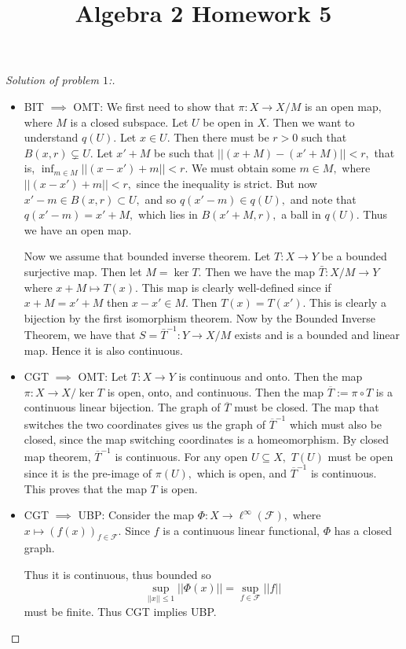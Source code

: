 \documentclass[letterpaper,11pt,twoside]{article}
\title{Algebra 2 Homework 5}
\theoremstyle{proposition}
\theoremstyle{definition}
\theoremstyle{theorem}
\theoremstyle{definition}
\theoremstyle{definition}
\theoremstyle{definition}
\theoremstyle{lemma}
\theoremstyle{definition}
\theoremstyle{definition}
\theoremstyle{corollary}
\theoremstyle{definition}
\theoremstyle{definition}
\theoremstyle{definition}
\newcommand{\norm}[1]{\left \vert \left \vert #1 \right \vert \right \vert}
\begin{document}
	\maketitle
	\begin{proof}[Solution of problem $1$:]
		\begin{itemize}
			\item BIT $\implies$ OMT: We first need to show that $\pi: X \to X/M$ is an open map, where $M$ is a closed subspace. Let $U$ be open in $X.$ 
			Then we want to understand $q(U).$ Let $x \in U.$ Then there must be $r >0$ such that $B(x,r) \subsetneq U.$ Let $x'+M$ be such that 
			$\norm{(x+M)-(x'+M)} <r,$ that is, $\inf_{m \in M} \norm{(x-x')+m} <r.$ We must obtain some $m \in M,$ where $ \norm{(x-x')+m} <r,$ since the 
			inequality is strict. But now $x'-m \in B(x,r) \subset U,$ and so $q(x'-m) \in q(U),$ and note that $q(x'-m)=x'+M,$ which lies in $B(x'+M,r),$ a 
			ball in $q(U).$ Thus we have an open map.
			
			Now we assume that bounded inverse theorem. Let $T:X \to Y$ be a bounded surjective map. Then let $M=\ker T.$ Then we have the map $\bar{T}: X/M 
			\to Y$ where $x+M \mapsto T(x).$  This map is clearly well-defined since if $x+M=x'+M$ then $x-x' \in M.$ Then $T(x)=T(x').$ This is clearly a 
			bijection by the first isomorphism theorem.  Now by the Bounded Inverse Theorem, we have that $S= \bar{T}^{-1}: Y \to X/M$ exists and is a 
			bounded and linear map. Hence it is also continuous. 
			\item CGT $\implies$ OMT: Let $T:X \to Y$ is continuous and onto. Then the map $\pi: X \to X/\ker T$ is open, onto, and continuous. Then the map 
			$\overline{T} := \pi \circ T$ is a continuous linear bijection. The graph of $\overline{T}$ must be closed. The map that switches the two 
			coordinates gives us the graph of $\overline{T}^{-1}$ which must also be closed, since the map switching coordinates is a homeomorphism. By 
			closed map theorem, $\overline{T}^{-1}$ is continuous. For any open $U \subseteq X,$ $T(U)$ must be open since it is the pre-image of $\pi(U),$ 
			which is open, and $\overline{T}^{-1}$ is continuous. This proves that the map $T$ is open. 
			
			\item CGT $\implies$ UBP: Consider the map $\Phi: X \to \ell^{\infty} (\mathcal{F}),$ where $x \mapsto (f(x))_{f \in \mathcal{F}}.$ 
			Since $f$ is a continuous linear functional, $\Phi$ has a closed graph. 
			
			Thus it is continuous, thus bounded so $$\sup_{\norm{x} \leq 1} \norm{\Phi(x)}= \sup_{f \in \mathcal{F}} \norm{f} $$ 
			must be finite. Thus CGT implies UBP.
		\end{itemize}
	\end{proof}
\end{document}
